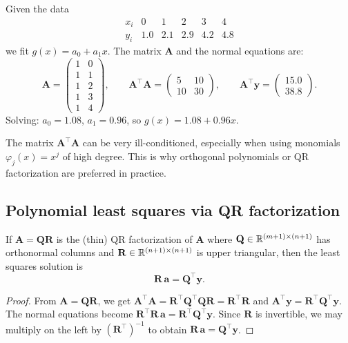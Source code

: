 \begin{example}
\label{ex:linear-ls}
Given the data
\[
\begin{array}{c|ccccc}
    x_i & 0 & 1 & 2 & 3 & 4 \\
    \hline
    y_i & 1.0 & 2.1 & 2.9 & 4.2 & 4.8
\end{array}
\]
we fit $g(x) = a_0 + a_1 x$. The matrix $\mathbf{A}$ and the normal equations are:
\[
    \mathbf{A} = \begin{pmatrix} 1 & 0 \\ 1 & 1 \\ 1 & 2 \\ 1 & 3 \\ 1 & 4 \end{pmatrix}, \qquad
    \mathbf{A}^\top\mathbf{A} = \begin{pmatrix} 5 & 10 \\ 10 & 30 \end{pmatrix}, \qquad
    \mathbf{A}^\top\mathbf{y} = \begin{pmatrix} 15.0 \\ 38.8 \end{pmatrix}.
\]
Solving: $a_0 = 1.08$, $a_1 = 0.96$, so $g(x) = 1.08 + 0.96x$.
\end{example}

\begin{warning}
The matrix $\mathbf{A}^\top\mathbf{A}$ can be very ill-conditioned, especially when using monomials $\varphi_j(x) = x^j$ of high degree. This is why orthogonal polynomials or QR factorization are preferred in practice.
\end{warning}

\subsection{Polynomial least squares via QR factorization}

\begin{proposition}
\label{prop:qr-ls}
If $\mathbf{A} = \mathbf{Q}\mathbf{R}$ is the (thin) QR factorization of $\mathbf{A}$ where $\mathbf{Q} \in \mathbb{R}^{(m+1)\times(n+1)}$ has orthonormal columns and $\mathbf{R} \in \mathbb{R}^{(n+1)\times(n+1)}$ is upper triangular, then the least squares solution is
\[
    \mathbf{R}\,\mathbf{a} = \mathbf{Q}^\top \mathbf{y}.
\]
\end{proposition}

\begin{proof}
From $\mathbf{A} = \mathbf{Q}\mathbf{R}$, we get $\mathbf{A}^\top\mathbf{A} = \mathbf{R}^\top\mathbf{Q}^\top\mathbf{Q}\mathbf{R} = \mathbf{R}^\top\mathbf{R}$ and $\mathbf{A}^\top\mathbf{y} = \mathbf{R}^\top\mathbf{Q}^\top\mathbf{y}$. The normal equations become $\mathbf{R}^\top\mathbf{R}\,\mathbf{a} = \mathbf{R}^\top\mathbf{Q}^\top\mathbf{y}$. Since $\mathbf{R}$ is invertible, we may multiply on the left by $(\mathbf{R}^\top)^{-1}$ to obtain $\mathbf{R}\,\mathbf{a} = \mathbf{Q}^\top\mathbf{y}$.
\end{proof}

